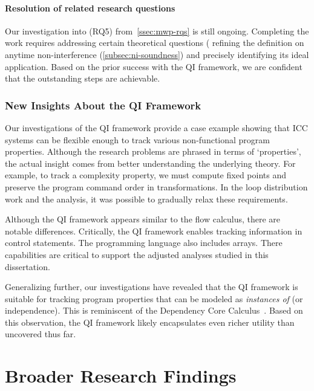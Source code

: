 \paragraph*{Resolution of related research questions}
Our investigation into (RQ5) from~\autoref{ssec:mwp-rqs} is still ongoing.
Completing the work requires addressing certain theoretical questions (\eg
refining the definition on anytime
non-interference (\autoref{subsec:ni-soundness})
and precisely identifying its ideal application. Based on the prior success with
the QI framework, we are confident that the outstanding steps are achievable.

\subsubsection{New Insights About the QI Framework}
\label{subsubsec:qi-res}

Our investigations of the QI framework provide a case example showing that ICC
systems can be flexible enough to track various non-functional program
properties. Although the research problems are
phrased in terms of `properties', the actual insight comes from better
understanding the underlying theory. For example, to track a complexity
property, we must compute fixed points and preserve the program command order in
transformations. In the loop distribution work and the 
analysis, it was possible to gradually relax these requirements.

Although the QI framework appears similar to the flow calculus, there are
notable differences. Critically, the QI framework enables tracking information
in control statements. The programming language also includes arrays. There
capabilities are critical to support the adjusted analyses studied in this
dissertation.

Generalizing further, our investigations have revealed that the  QI framework is
suitable for tracking program properties that can be modeled as \emph{instances
of } (or independence). This is reminiscent of the
Dependency Core Calculus~\cite{abadi1999b}. Based on this observation, the QI
framework likely encapsulates even richer utility than uncovered thus far.

\section{Broader Research Findings}
\label{sec:broader-findings}

